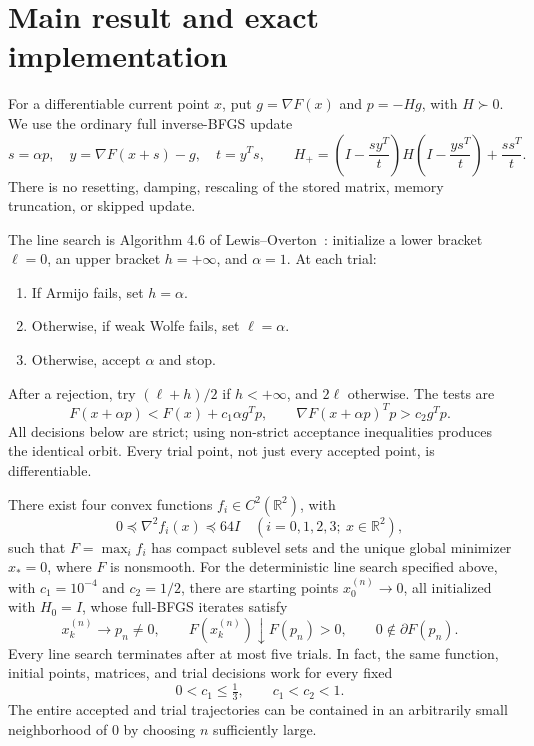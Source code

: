 \begingroup
\providecommand{\R}{}
\renewcommand{\R}{\mathbb R}
\providecommand{\B}{}
\renewcommand{\B}{\mathcal B}
\providecommand{\I}{}
\renewcommand{\I}{I}
\setcounter{section}{0}
\setcounter{theorem}{0}
\setcounter{lemma}{0}
\setcounter{corollary}{0}
\setcounter{proposition}{0}
\setcounter{remark}{0}
\setcounter{equation}{0}
\section{Main result and exact implementation}
For a differentiable current point $x$, put $g=\nabla F(x)$ and $p=-Hg$, with $H\succ0$. We use the ordinary full inverse-BFGS update
\begin{equation}\label{D:bfgs}
 s=\alpha p,\quad y=\nabla F(x+s)-g,\quad t=y^Ts,\qquad
 H_+=\left(I-\frac{sy^T}{t}\right)H\left(I-\frac{ys^T}{t}\right)+\frac{ss^T}{t}.
\end{equation}
There is no resetting, damping, rescaling of the stored matrix, memory truncation, or skipped update.

The line search is Algorithm 4.6 of Lewis--Overton~\cite{LO}: initialize a lower bracket $\ell=0$, an upper bracket $h=+\infty$, and $\alpha=1$. At each trial:
\begin{enumerate}
\item If Armijo fails, set $h=\alpha$.
\item Otherwise, if weak Wolfe fails, set $\ell=\alpha$.
\item Otherwise, accept $\alpha$ and stop.
\end{enumerate}
After a rejection, try $(\ell+h)/2$ if $h<+\infty$, and $2\ell$ otherwise. The tests are
\[
 F(x+\alpha p)<F(x)+c_1\alpha g^Tp,
 \qquad \nabla F(x+\alpha p)^Tp>c_2g^Tp.
\]
All decisions below are strict; using non-strict acceptance inequalities produces the identical orbit. Every trial point, not just every accepted point, is differentiable.

\begin{theorem}\label{D:main}
There exist four convex functions $f_i\in C^2(\R^2)$, with
\[
 0\preceq\nabla^2 f_i(x)\preceq64I \quad(i=0,1,2,3;\ x\in\R^2),
\]
such that $F=\max_i f_i$ has compact sublevel sets and the unique global minimizer $x_*=0$, where $F$ is nonsmooth. For the deterministic line search specified above, with $c_1=10^{-4}$ and $c_2=1/2$, there are starting points $x_0^{(n)}\to0$, all initialized with $H_0=I$, whose full-BFGS iterates satisfy
\[
 x_k^{(n)}\longrightarrow p_n\ne0,\qquad
 F(x_k^{(n)})\downarrow F(p_n)>0,\qquad 0\notin\partial F(p_n).
\]
Every line search terminates after at most five trials. In fact, the same function, initial points, matrices, and trial decisions work for every fixed
\[
 0<c_1\le\tfrac13,\qquad c_1<c_2<1.
\]
The entire accepted and trial trajectories can be contained in an arbitrarily small neighborhood of $0$ by choosing $n$ sufficiently large.
\end{theorem}

